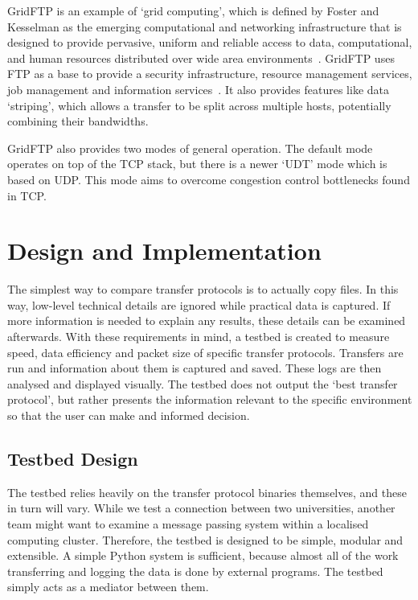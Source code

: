 \documentclass{sig-alternate-05-2015}
\begin{document}
GridFTP is an example of `grid computing', which is defined by Foster and Kesselman as the emerging computational and networking infrastructure that is designed to provide pervasive, uniform and reliable access to data, computational, and human resources distributed over wide area environments~\cite{foster}. GridFTP uses FTP as a base to provide a security infrastructure, resource management services, job management and information services~\cite{allcock2001secure}. It also provides features like data `striping', which allows a transfer to be split across multiple hosts, potentially combining their bandwidths.

GridFTP also provides two modes of general operation. The default mode operates on top of the TCP stack, but there is a newer `UDT' mode which is based on UDP\@. This mode aims to overcome congestion control bottlenecks found in TCP\@. 

\section{Design and Implementation}
The simplest way to compare transfer protocols is to actually copy files. In this way, low-level technical details are ignored while practical data is captured. If more information is needed to explain any results, these details can be examined afterwards. With these requirements in mind, a testbed is created to measure speed, data efficiency and packet size of specific transfer protocols. Transfers are run and information about them is captured and saved. These logs are then analysed and displayed visually. The testbed does not output the `best transfer protocol', but rather presents the information relevant to the specific environment so that the user can make and informed decision.

\subsection{Testbed Design}
The testbed relies heavily on the transfer protocol binaries themselves, and these in turn will vary. While we test a connection between two universities, another team might want to examine a message passing system within a localised computing cluster. Therefore, the testbed is designed to be simple, modular and extensible. A simple Python system is sufficient, because almost all of the work transferring and logging the data is done by external programs. The testbed simply acts as a mediator between them.
\end{document}
